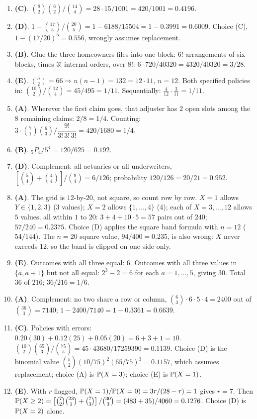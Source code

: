 \begin{enumerate}[label=\arabic*.,nosep]
\item \textbf{(C)}. $\binom{8}{2}\binom{6}{2}/\binom{14}{4} = 28\cdot 15/1001 = 420/1001 = 0.4196$.
\item \textbf{(D)}. $1 - \binom{17}{5}/\binom{20}{5} = 1 - 6188/15504 = 1 - 0.3991 = 0.6009$.
Choice (C), $1-(17/20)^5 = 0.556$, wrongly assumes replacement.
\item \textbf{(B)}. Glue the three homeowners files into one block: $6!$ arrangements of six
blocks, times $3!$ internal orders, over $8!$: $6\cdot 720/40320 = 4320/40320 = 3/28$.
\item \textbf{(E)}. $\binom{n}{2}=66 \Rightarrow n(n-1)=132=12\cdot 11$, $n=12$. Both specified
policies in: $\binom{10}{2}/\binom{12}{4} = 45/495 = 1/11$. Sequentially:
$\frac{4}{12}\cdot\frac{3}{11} = 1/11$.
\item \textbf{(A)}. Wherever the first claim goes, that adjuster has $2$ open slots among the
$8$ remaining claims: $2/8 = 1/4$. Counting: $3\cdot\binom{7}{1}\binom{6}{3}/\dfrac{9!}{3!\,3!\,3!} = 420/1680 = 1/4$.
\item \textbf{(B)}. ${}_5P_4/5^4 = 120/625 = 0.192$.
\item \textbf{(D)}. Complement: all actuaries or all underwriters,
$\left[\binom{5}{4}+\binom{4}{4}\right]/\binom{9}{4} = 6/126$; probability $120/126 = 20/21 = 0.952$.
\item \textbf{(A)}. The grid is $12$-by-$20$, not square, so count row by row. $X=1$ allows
$Y\in\{1,2,3\}$ ($3$ values); $X=2$ allows $\{1,\dots,4\}$ ($4$); each of $X=3,\dots,12$
allows $5$ values, all within $1$ to $20$: $3+4+10\cdot 5 = 57$ pairs out of $240$;
$57/240 = 0.2375$. Choice (D) applies the square band formula with $n=12$
($54/144$). The $n=20$ square value, $94/400 = 0.235$, is also wrong: $X$ never
exceeds $12$, so the band is clipped on one side only.
\item \textbf{(E)}. Outcomes with all three equal: $6$. Outcomes with all three values in
$\{a,a+1\}$ but not all equal: $2^3-2 = 6$ for each $a = 1,\dots,5$, giving $30$. Total
$36$ of $216$; $36/216 = 1/6$.
\item \textbf{(A)}. Complement: no two share a row or column,
$\binom{6}{3}\cdot 6\cdot 5\cdot 4 = 2400$ out of $\binom{36}{3} = 7140$;
$1 - 2400/7140 = 1 - 0.3361 = 0.6639$.
\item \textbf{(C)}. Policies with errors: $0.20(30)+0.12(25)+0.05(20) = 6+3+1 = 10$.
$\binom{10}{2}\binom{65}{3}/\binom{75}{5} = 45\cdot 43680/17259390 = 0.1139$. Choice (D)
is the binomial value $\binom{5}{2}(10/75)^2(65/75)^3 = 0.1157$, which assumes replacement;
choice (A) is $\mathbb{P}(X=3)$; choice (E) is $\mathbb{P}(X=1)$.
\item \textbf{(E)}. With $r$ flagged, $\mathbb{P}(X=1)/\mathbb{P}(X=0) = 3r/(28-r) = 1$ gives $r = 7$.
Then $\mathbb{P}(X\ge 2) = \left[\binom{7}{2}\binom{23}{1}+\binom{7}{3}\right]/\binom{30}{3}
= (483+35)/4060 = 0.1276$. Choice (D) is $\mathbb{P}(X=2)$ alone.
\end{enumerate}

